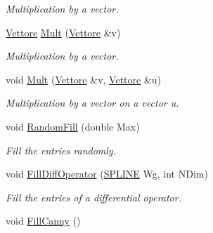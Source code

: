 \begin{DoxyCompactItemize}
\begin{DoxyCompactList}\small\item\em \-Multiplication by a vector. \end{DoxyCompactList}\item 
\hypertarget{classMatrice_af36b6d3637e838ca5e695c27a598df13}{\hyperlink{classVettore}{\-Vettore} \hyperlink{classMatrice_af36b6d3637e838ca5e695c27a598df13}{\-Mult} (\hyperlink{classVettore}{\-Vettore} \&v)}\label{classMatrice_af36b6d3637e838ca5e695c27a598df13}

\begin{DoxyCompactList}\small\item\em \-Multiplication by a vector. \end{DoxyCompactList}\item 
\hypertarget{classMatrice_a97ad116b8ad02f27c746c17b3bcce612}{void \hyperlink{classMatrice_a97ad116b8ad02f27c746c17b3bcce612}{\-Mult} (\hyperlink{classVettore}{\-Vettore} \&v, \hyperlink{classVettore}{\-Vettore} \&u)}\label{classMatrice_a97ad116b8ad02f27c746c17b3bcce612}

\begin{DoxyCompactList}\small\item\em \-Multiplication by a vector on a vector u. \end{DoxyCompactList}\item 
\hypertarget{classMatrice_af5aec4d0a8386473246317d8f80393b5}{void \hyperlink{classMatrice_af5aec4d0a8386473246317d8f80393b5}{\-Random\-Fill} (double \-Max)}\label{classMatrice_af5aec4d0a8386473246317d8f80393b5}

\begin{DoxyCompactList}\small\item\em \-Fill the entries randomly. \end{DoxyCompactList}\item 
\hypertarget{classMatrice_a7c602135948f6cf92eb09ad149cf9e5d}{void \hyperlink{classMatrice_a7c602135948f6cf92eb09ad149cf9e5d}{\-Fill\-Diff\-Operator} (\hyperlink{structSPLINE}{\-S\-P\-L\-I\-N\-E} \-Wg, int \-N\-Dim)}\label{classMatrice_a7c602135948f6cf92eb09ad149cf9e5d}

\begin{DoxyCompactList}\small\item\em \-Fill the entries of a differential operator. \end{DoxyCompactList}\item 
\hypertarget{classMatrice_a3d2595adaba8bd47736da2b21bd2fd77}{void \hyperlink{classMatrice_a3d2595adaba8bd47736da2b21bd2fd77}{\-Fill\-Canny} ()}\label{classMatrice_a3d2595adaba8bd47736da2b21bd2fd77}


\end{DoxyCompactItemize}
